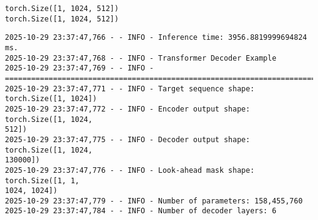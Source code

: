 \documentclass[12pt]{article}
\begin{document}
    \begin{Verbatim}[commandchars=\\\{\}]
torch.Size([1, 1024, 512])
torch.Size([1, 1024, 512])
    \end{Verbatim}

    \begin{Verbatim}[commandchars=\\\{\}]
2025-10-29 23:37:47,766 - - INFO - Inference time: 3956.8819999694824 ms.
2025-10-29 23:37:47,768 - - INFO - Transformer Decoder Example
2025-10-29 23:37:47,769 - - INFO -
================================================================================
2025-10-29 23:37:47,771 - - INFO - Target sequence shape: torch.Size([1, 1024])
2025-10-29 23:37:47,772 - - INFO - Encoder output shape: torch.Size([1, 1024,
512])
2025-10-29 23:37:47,775 - - INFO - Decoder output shape: torch.Size([1, 1024,
130000])
2025-10-29 23:37:47,776 - - INFO - Look-ahead mask shape: torch.Size([1, 1,
1024, 1024])
2025-10-29 23:37:47,779 - - INFO - Number of parameters: 158,455,760
2025-10-29 23:37:47,784 - - INFO - Number of decoder layers: 6
    \end{Verbatim}
\end{document}
